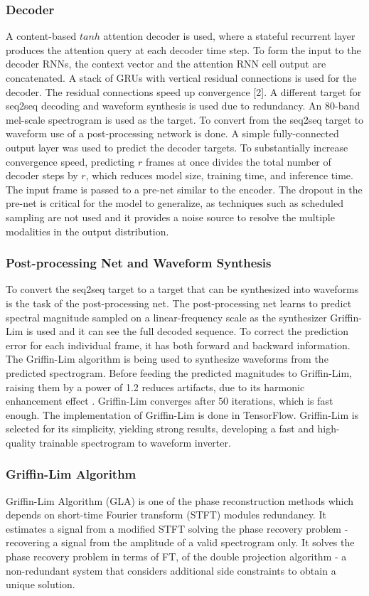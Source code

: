 \documentclass[runningheads]{llncs}
\begin{document}
\subsubsection{Decoder}
A content-based $tanh$ attention decoder is used, where a stateful recurrent layer produces the attention query at each decoder time step. To form the input to the decoder RNNs, the context vector and the attention RNN cell output are concatenated. A stack of GRUs with vertical residual connections is used for the decoder. The residual connections speed up convergence [2]. A different target for seq2seq decoding and waveform synthesis is used due to redundancy. An 80-band mel-scale spectrogram is used as the target. To convert from the seq2seq target to waveform use of a post-processing network is done. A simple fully-connected output layer was used to predict the decoder targets. To substantially increase convergence speed, predicting $r$
frames at once divides the total number of decoder steps by
$r$, which reduces model size, training time, and inference time. The input frame is passed to a pre-net similar to the encoder. The dropout in the pre-net is critical for the model to generalize, as techniques such as scheduled sampling are not used and it provides a noise source to resolve the multiple modalities in the output distribution.

\subsubsection{Post-processing Net and Waveform Synthesis}
To convert the seq2seq target to a target that can be synthesized into waveforms is the task  of the post-processing net. The post-processing net learns to predict spectral magnitude sampled on a linear-frequency scale as the synthesizer Griffin-Lim is used and it can see the full decoded sequence. To correct the prediction error for each individual frame, it has both forward and backward information. The Griffin-Lim algorithm is being used to synthesize waveforms from the predicted spectrogram. Before feeding the predicted magnitudes to Griffin-Lim, raising them by a power of 1.2  reduces artifacts, due to its harmonic enhancement effect \cite{ref_paper3}. Griffin-Lim converges after 50 iterations, which is fast enough. The implementation of Griffin-Lim is done in TensorFlow. Griffin-Lim is selected for its simplicity, yielding strong results, developing a fast and high-quality trainable spectrogram to waveform inverter.   

\subsubsection{Griffin-Lim Algorithm}
Griffin-Lim Algorithm (GLA) is one of the phase reconstruction methods which depends on short-time Fourier transform (STFT) modules redundancy. It estimates a signal from a modified STFT solving the phase recovery problem - recovering a signal from the amplitude of a valid spectrogram only. It solves the phase recovery problem in terms of FT, of the double projection algorithm - a non-redundant system that considers additional side constraints to obtain a unique solution.\cite{ref_paper4}
\end{document}

